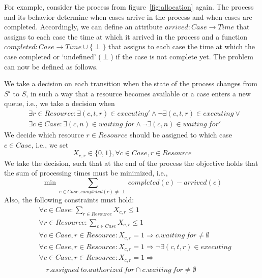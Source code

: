 \documentclass[runningheads]{llncs}
\newenvironment{problemdescription}
  {\begin{list}{}{\setlength{\leftmargin}{1cm}\setlength{\rightmargin}{1cm}}\item[]}
  {\end{list}}
\newcommand{\mt}[1]{\mathit{#1}}
\begin{document}
For example, consider the process from figure~\ref{fig:allocation} again. The process and its behavior determine when cases arrive in the process and when cases are completed. Accordingly, we can define an attribute $arrived: Case \rightarrow Time$ that assigns to each case the time at which it arrived in the process and a function $completed: Case \rightarrow Time \cup \{\perp\}$ that assigns to each case the time at which the case completed or `undefined' ($\perp$) if the case is not complete yet. The problem can now be defined as follows.

\begin{problemdescription}
We take a decision on each transition when the state of the process changes from $S'$ to $S$, in such a way that a resource becomes available or a case enters a new queue, i.e., we take a decision when
\begin{align*}
&\exists r \in Resource: \exists (c, t, r) \in \mt{executing}' \land \lnot \exists (c, t, r) \in \mt{executing} \lor \\
&\exists c \in Case: \exists (c, n) \in \mt{waiting\ for} \land \lnot \exists (c, n) \in \mt{waiting\ for}'    
\end{align*}
We decide which resource $r \in Resource$ should be assigned to which case $c \in Case$, i.e., we set 
\[X_{c, r} \in \{0, 1\}, \forall c \in \mt{Case}, r \in \mt{Resource}\]
We take the decision, such that at the end of the process the objective holds that the sum of processing times must be minimized, i.e., 
\[\min \textstyle\sum_{c \in Case, completed(c)\neq \perp} completed(c) - arrived(c)\]
Also, the following constraints must hold:
\begin{align*}
&\forall c \in \mt{Case}: \textstyle\sum_{r \in \mt{Resource}} X_{c, r} \leq 1\\
&\forall r \in \mt{Resource}: \textstyle\sum_{c \in \mt{Case}} X_{c, r} \leq 1\\
&\forall c \in \mt{Case}, r \in \mt{Resource}: X_{c, r} = 1 \Rightarrow c.waiting\ for \neq \emptyset\\
&\forall c \in \mt{Case}, r \in \mt{Resource}: X_{c, r} = 1 \Rightarrow \lnot \exists (c, t, r) \in \mt{executing}\\
&\forall c \in \mt{Case}, r \in \mt{Resource}: X_{c, r} = 1 \Rightarrow \\ 
&\quad \mt{r.assigned\ to.authorized\ for} \cap \mt{c.waiting\ for} \neq \emptyset
\end{align*}
\end{problemdescription}
\end{document}
